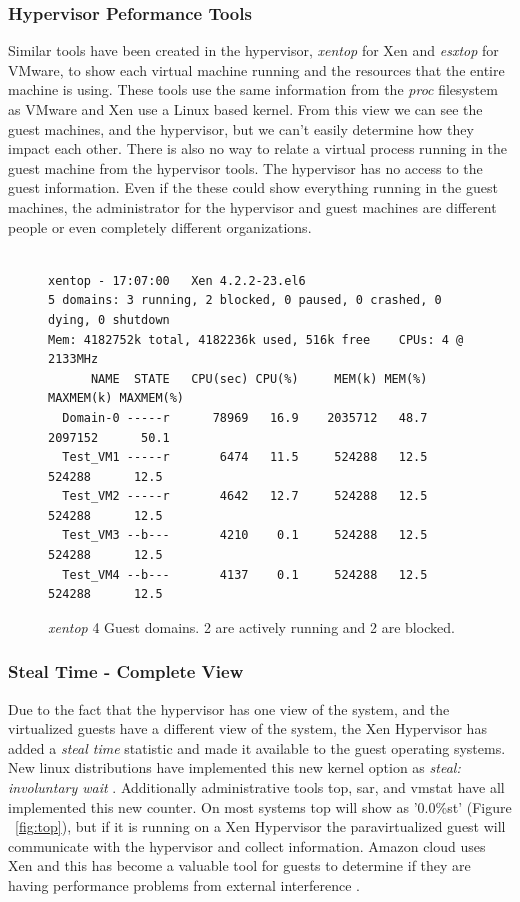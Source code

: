 \subsubsection{Hypervisor Peformance Tools}
Similar tools have been created in the hypervisor, \emph{xentop} for Xen and \emph{esxtop} for VMware, to show each virtual machine running and the resources that the entire machine is using.  
These tools use the same information from the \emph{proc} filesystem as VMware and Xen use a Linux based kernel.  
From this view we can see the guest machines, and the hypervisor, but we can't easily determine how they impact each other.  There is also no way to relate a virtual process running in the guest machine from the hypervisor tools.  The hypervisor has no access to the guest information.
Even if the these could show everything running in the guest machines, the administrator for the hypervisor and guest machines are different people or even completely different organizations. 

\begin{figure}[h]
\begin{Verbatim}

xentop - 17:07:00   Xen 4.2.2-23.el6
5 domains: 3 running, 2 blocked, 0 paused, 0 crashed, 0 dying, 0 shutdown
Mem: 4182752k total, 4182236k used, 516k free    CPUs: 4 @ 2133MHz
      NAME  STATE   CPU(sec) CPU(%)     MEM(k) MEM(%)  MAXMEM(k) MAXMEM(%) 
  Domain-0 -----r      78969   16.9    2035712   48.7    2097152      50.1    
  Test_VM1 -----r	    6474   11.5     524288   12.5     524288      12.5     
  Test_VM2 -----r	    4642   12.7     524288   12.5     524288      12.5 
  Test_VM3 --b---	    4210    0.1     524288   12.5     524288      12.5     
  Test_VM4 --b---	    4137    0.1     524288   12.5     524288      12.5  
\end{Verbatim}
\caption{\emph{xentop} 4 Guest domains. 2 are actively running and 2 are blocked.}
\label{fig:xentop}
\end{figure}

\subsubsection{Steal Time - Complete View}
Due to the fact that the hypervisor has one view of the system, and the virtualized guests have a different view of the system, the Xen Hypervisor has added a \emph{steal time} statistic and made it available to the guest operating systems.  New linux distributions have implemented this new kernel option as \emph{steal: involuntary wait} \cite{proc}.  Additionally administrative tools top, sar, and vmstat have all implemented this new counter.  
On most systems top will show as '0.0\%st' (Figure ~\ref{fig:top}), but if it is running on a Xen Hypervisor the paravirtualized guest will communicate with the hypervisor and collect information. Amazon cloud uses Xen and this has become a valuable tool for guests to determine if they are having performance problems from external interference \cite{netflix}.

